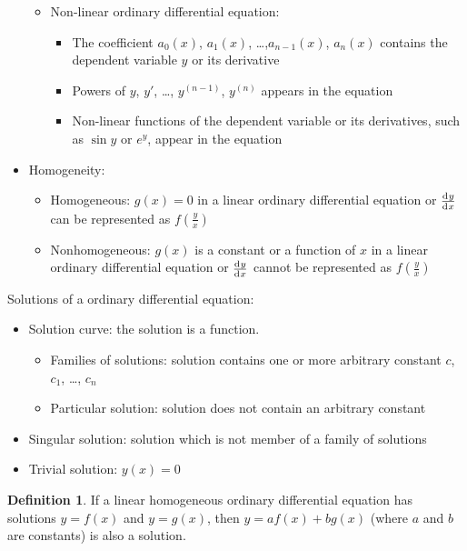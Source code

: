 \documentclass[10pt, twocolumn]{article}
\theoremstyle{definition}
\newtheorem*{definition}{Definition}
\begin{document}
\begin{itemize}
\begin{itemize}
          \item Non-linear ordinary differential equation:
                \begin{itemize}
                  \item The coefficient \(a_0 (x)\), \(a_1 (x)\), \dots,\(a_{n - 1}(x)\), \(a_n (x)\) contains the dependent variable \(y\) or its derivative
                  \item Powers of \(y\), \(y'\), \dots, \(y^{(n - 1)}\), \(y^{(n)}\) appears in the equation
                  \item Non-linear functions of the dependent variable or its derivatives, such as \(\sin{y}\) or \(e^y \), appear in the equation
                \end{itemize}
        \end{itemize}
  \item Homogeneity:
        \begin{itemize}
          \item Homogeneous: \(g(x) = 0\) in a linear ordinary differential equation or \(\frac{\mathrm{d}^{} y}{\mathrm{d}^{} x}\) can be represented as \(f\left( \frac{y}{x} \right)\)
          \item Nonhomogeneous: \(g(x)\) is a constant or a function of \(x\) in a linear ordinary differential equation or \(\frac{\mathrm{d}^{} y}{\mathrm{d}^{} x}\) cannot be represented as \(f\left( \frac{y}{x} \right)\)
        \end{itemize}
\end{itemize}

Solutions of a ordinary differential equation:
\begin{itemize}
  \item Solution curve: the solution is a function.
        \begin{itemize}
          \item Families of solutions: solution contains one or more arbitrary constant \(c\), \( c_1 \), \dots, \( c_n \)
          \item Particular solution: solution does not contain an arbitrary constant
        \end{itemize}
  \item Singular solution: solution which is not member of a family of solutions
  \item Trivial solution: \(y(x) = 0\)
\end{itemize}


\begin{definition}
  If a linear homogeneous ordinary differential equation has solutions \(y = f(x)\) and \(y = g(x)\), then \(y = af(x) + bg(x)\) (where \(a\) and \(b\) are constants) is also a solution.
\end{definition}
\end{document}
